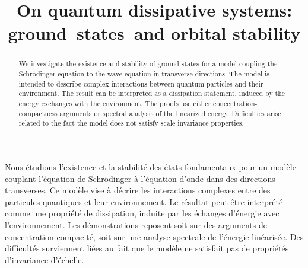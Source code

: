 \documentclass[JEP,XML,SOM,NoEqCountersInSection,NoFloatCountersInSection,Unicode,published]{cedram}
\theoremstyle{definition}
\begin{document}
\frontmatter

\title{On quantum dissipative systems: ground~states~and orbital stability}

\author[\initial{T.} \lastname{Goudon}]{ }
\address{Université Côte d'Azur, Inria, CNRS, LJAD\\
Parc Valrose, F-06108 Nice, France}

\author[\initial{L.} \lastname{Vivion}]{ }
\address{Université Côte d'Azur, Inria, CNRS, LJAD\\
Parc Valrose, F-06108 Nice, France}

\begin{abstract}
We investigate the existence and stability of ground states for a model coupling the Schrödinger equation to the wave equation in transverse directions. The model is intended to describe complex interactions between quantum particles and their environment. The result can be interpreted as a dissipation statement, induced by the energy exchanges with the environment. The proofs use either concentration-compactness arguments or spectral analysis of the linearized energy. Difficulties arise related to the fact the model does not satisfy scale invariance properties.
\end{abstract}





\begin{altabstract}
Nous étudions l'existence et la stabilité des états fondamentaux pour un modèle couplant l'équation de Schrödinger à l'équation d'onde dans des directions transverses. Ce modèle vise à décrire les interactions complexes entre des particules quantiques et leur environnement. Le résultat peut être interprété comme une propriété de dissipation, induite par les échanges d'énergie avec l'environnement. Les démonstrations reposent soit sur des arguments de concentration-compacité, soit sur une analyse spectrale de l'énergie linéarisée. Des difficultés surviennent liées au fait que le modèle ne satisfait pas de propriétés d'invariance d'échelle.
\end{altabstract}
\maketitle
\end{document}
